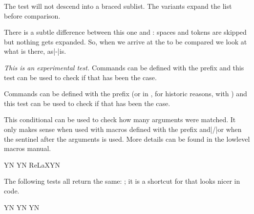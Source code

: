The \type {\ifhaschar} test will not descend into a braced sublist. The 
variants expand the list before comparison.

\stopsectionlevel

\startsectionlevel[title={\tex{ifcstok}}]

There is a subtle difference between this one and \type {\iftok}: spaces
and \type {\relax} tokens are skipped but nothing gets expanded. So, when
we arrive at the to be compared  we look at what is there,
as|-|is.

\stopsectionlevel

\startsectionlevel[title={\tex{iffrozen}}]

{\em This is an experimental test.} Commands can be defined with the \type
{\frozen} prefix and this test can be used to check if that has been the case.

\stopsectionlevel

\startsectionlevel[title={\tex{ifprotected}}]

Commands can be defined with the \type {\protected} prefix (or in \CONTEXT, for
historic reasons, with \type {\unexpanded}) and this test can be used to check if
that has been the case.

\stopsectionlevel

\startsectionlevel[title={\tex{ifarguments}}]

This conditional can be used to check how many arguments were matched. It only
makes sense when used with macros defined with the \type {\tolerant} prefix
and|/|or when the sentinel \type {\ignorearguments} after the arguments is used.
More details can be found in the lowlevel macros manual.

\stopsectionlevel

\startsectionlevel[title={\tex{ifrelax}}]

\startbuffer
            \ifrelax\relax                  Y\else N\fi
            \ifrelax\norelax                Y\else N\fi
\expandafter\ifrelax\csname ReLaX\endcsname Y\else N\fi
\stopbuffer

The following tests all return the same: \inlinebuffer; it is a shortcut for
 that looks nicer in code.

\typebuffer[option=TEX]

\stopsectionlevel

\startsectionlevel[title={\tex{ifempty}}]

\startbuffer
\ifempty{}     Y\else N\fi
\ifempty{!}    Y\else N\fi
\ifempty\empty Y\else N\fi
\stopbuffer


